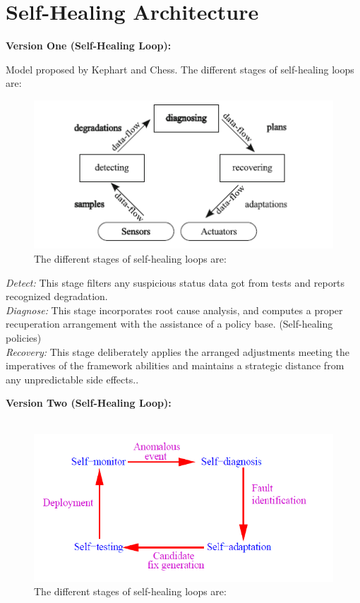 \chapter{Self-Healing Architecture} \label{ch:selfHelingArchitecture}

\textbf{Version One (Self-Healing Loop):\\}

Model proposed by Kephart and Chess. The different stages of self-healing loops are: \\


\begin{figure}[H]
\includegraphics[width=5in]{img/SelfHealingStages}
\caption{The different stages of self-healing loops are:}
\end{figure}

\textit{Detect:} This stage filters any suspicious status data got from tests and reports recognized degradation.\\

\textit{Diagnose:} This stage incorporates root cause analysis, and computes a proper recuperation arrangement with the assistance of a policy base. (Self-healing policies)\\

\textit{Recovery:} This stage deliberately applies the arranged adjustments meeting the imperatives of the framework abilities and maintains a strategic distance from any unpredictable side effects.\cite{Harald:SelfHealingSurvey:2011}.   

\textbf{Version Two (Self-Healing Loop):\\}\\

\begin{figure}[H]
\includegraphics[width=5in]{img/Figure4}
\caption{The different stages of self-healing loops are:}
\end{figure}

